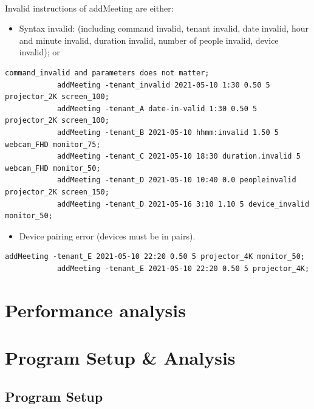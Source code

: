 \documentclass{article}
\begin{document}
        \paragraph{}
        Invalid instructions of addMeeting are either:
        
        \begin{itemize}
        \item Syntax invalid: (including command invalid, tenant invalid, date invalid, hour and minute invalid,
        duration invalid, number of people invalid, device invalid); or
        \end{itemize}
        
        \begin{Verbatim}[gobble=8]
            command_invalid and parameters does not matter;
            addMeeting -tenant_invalid 2021-05-10 1:30 0.50 5 projector_2K screen_100;
            addMeeting -tenant_A date-in-valid 1:30 0.50 5 projector_2K screen_100;
            addMeeting -tenant_B 2021-05-10 hhmm:invalid 1.50 5 webcam_FHD monitor_75;
            addMeeting -tenant_C 2021-05-10 18:30 duration.invalid 5 webcam_FHD monitor_50;
            addMeeting -tenant_D 2021-05-10 10:40 0.0 peopleinvalid projector_2K screen_150;
            addMeeting -tenant_D 2021-05-16 3:10 1.10 5 device_invalid monitor_50;
        \end{Verbatim}
        \begin{itemize}
        \item Device pairing error (devices must be in pairs).
        \end{itemize}
        \begin{Verbatim}[gobble=8]
            addMeeting -tenant_E 2021-05-10 22:20 0.50 5 projector_4K monitor_50; 
            addMeeting -tenant_E 2021-05-10 22:20 0.50 5 projector_4K; 
        \end{Verbatim}
        

    \cleardoublepage
    \section{Performance analysis}

    \cleardoublepage
    \section{Program Setup \& Analysis}
        \subsection{Program Setup}
\end{document}
